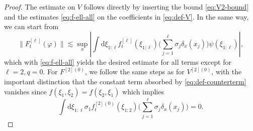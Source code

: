 \documentclass[11pt, a4paper]{scrartcl}
\numberwithin{equation}{section}
\theoremstyle{plain}
\theoremstyle{remark}
\newcommand{\mathd}{\mathrm{d}}
\begin{document}
\begin{proof}
  The estimate on $V$ follows directly by inserting the bound \eqref{eq:V2-bound} and the estimates \eqref{eq:f-ell-all} on the coefficients in \eqref{eq:def-V}. 
  In the same way, we can start from
  \[\|F^{[\ell]}_t(\varphi)\|\lesssim \sup_x| \int \mathd \xi_{1:\ell} f^{[\ell]}_t(\xi_{1:\ell})\big(\sum_{j=1}^{\ell}\sigma_j\delta_x(x_j)\big) \psi(\xi_{1:\ell})|,\]
  which with \eqref{eq:f-ell-all} yields the desired estimate for all terms except for $\ell=2,q=0$. For $F^{[2](0)}$, we follow the same steps as for $V^{[2](0)}$, with the important distinction that the constant term
  absorbed by \eqref{eq:def-counterterm} vanishes since $f(\xi_1,\xi_2)=f(\xi_2,\xi_1)$ which implies
  \[\int \mathd \xi_{1:\ell} \sigma_1 f_t^{[2](0)}(\xi_{1:2})\big(\sum_{j=1}^{\ell}\sigma_j\delta_x(x_j)\big)=0.\]
\end{proof}
\end{document}
